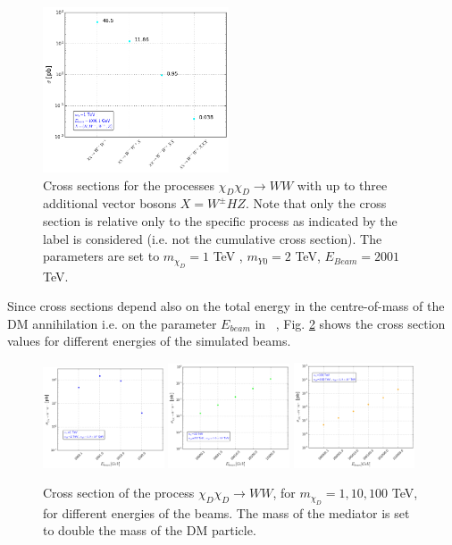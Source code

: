 \documentclass[epj,nopacs,fleqn]{svjour}
\begin{document}
\begin{figure}[!b]
	\centering
	\includegraphics[width=0.49\textwidth]{Fig/XSEC/processes_xsec_1_TeV.png}
	\caption{Cross sections for the processes $\chi_D \chi_D \rightarrow WW$ with up to three additional vector bosons $X=W^{\pm} H Z$. Note that only the cross section is relative only to the specific process as indicated by the label is considered (i.e. not the cumulative cross section). The parameters are set to $m_{\chi _D}= 1$ TeV , $m_{Y0}= 2$ TeV, $E_{Beam}=2001$ TeV.}
\label{xsec_1TeV}
\end{figure}
%
Since cross sections depend also on the total energy in the centre-of-mass of the DM annihilation i.e. on the parameter $E_{beam}$ in \MG~, Fig. \ref{xsec_ebeam} shows the cross section values for different energies of the simulated beams.
%
\begin{figure}[!b]
	\centering
	\subfigure
	{ \includegraphics[width=0.32\textwidth]{Fig/XSEC/xsec_Ebeam_1_TeV.png}}
	\subfigure
	{ \includegraphics[width=0.32\textwidth]{Fig/XSEC/xsec_Ebeam_10_TeV.png}}
	\subfigure
	{ \includegraphics[width=0.32\textwidth]{Fig/XSEC/xsec_Ebeam_100_TeV.png}}
	\caption{Cross section of the process $\chi_D \chi_D \rightarrow WW$, for $m_{\chi _D}= 1,10,100$ TeV, for different energies of the beams. The mass of the mediator is set to double the mass of the DM particle.   }
\label{xsec_ebeam}
\end{figure}
\end{document}
